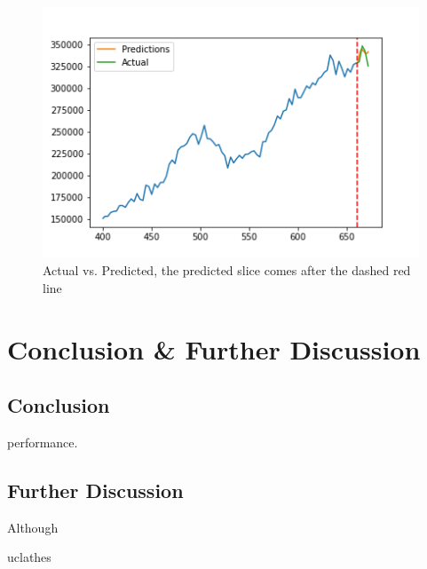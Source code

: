 \documentclass [MS] {uclathes}
\begin{document}
\begin{figure}[h!]
    \centering
    \includegraphics[scale=0.75]{figures/scale_actual_vs_pred.png}
    \caption{Actual vs. Predicted, the predicted slice comes after the dashed red line}
    \label{fig:actual_vs_pred}
\end{figure}

\chapter{Conclusion \& Further Discussion}
\section{Conclusion}
  performance.
 




\section{Further Discussion}
Although 

\nocite{}
 {uclathes}

\end{document}
